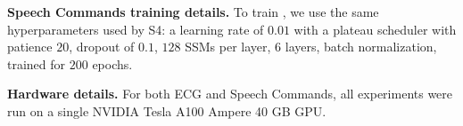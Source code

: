 \textbf{Speech Commands training details.} To train \ourmethod{}, we use the same hyperparameters used by S4: a learning rate of $0.01$ with a plateau scheduler with patience $20$, dropout of $0.1$, $128$ SSMs per layer, $6$ layers, batch normalization, trained for $200$ epochs.

\textbf{Hardware details.}
For both ECG and Speech Commands, all experiments were run on a single NVIDIA Tesla A100 Ampere 40 GB GPU.


